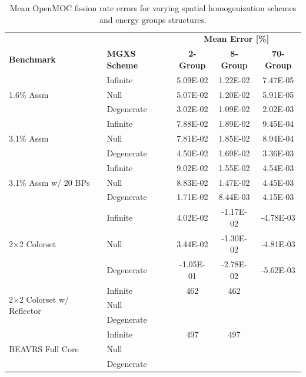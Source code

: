 \begin{table}[h!]
  \centering
  \caption[Mean OpenMOC fission rate errors]{Mean OpenMOC fission rate errors for varying spatial homogenization schemes and energy groups structures.}
  \small
  \label{table:chap8-openmoc-mean-fiss-rates}
  \vspace{6pt}
  \begin{tabular}{l l c c c}
  \toprule
  \rowcolor{lightgray}
  & & \multicolumn{3}{c}{\cellcolor{lightgray} \textbf{Mean Error [\%]}} \\
  \multirow{-2}{*}{\cellcolor{lightgray} \bf Benchmark} &
  \multirow{-2}{*}{\cellcolor{lightgray} \bf \ac{MGXS} Scheme} &
  {\cellcolor{lightgray} \bf 2-Group} &
  {\cellcolor{lightgray} \bf 8-Group} &
  {\cellcolor{lightgray} \bf 70-Group} \\
  \midrule
\multirow{3}{*}{\parbox{2.5cm}{1.6\% Assm}} & Infinite & 5.09E-02 & 1.22E-02 & 7.47E-05 \\
& Null & 5.07E-02 & 1.20E-02 & 5.91E-05 \\
& Degenerate & 3.02E-02 & 1.09E-02 & 2.02E-03 \\
  \midrule
\multirow{3}{*}{\parbox{2.5cm}{3.1\% Assm}} & Infinite & 7.88E-02 & 1.89E-02 & 9.45E-04 \\
& Null & 7.81E-02 & 1.85E-02 & 8.94E-04 \\
& Degenerate & 4.50E-02 & 1.69E-02 & 3.36E-03 \\
  \midrule
\multirow{3}{*}{\parbox{2.5cm}{3.1\% Assm w/ 20 BPs}} & Infinite & 9.02E-02 & 1.55E-02 & 4.54E-03 \\
& Null & 8.83E-02 & 1.47E-02 & 4.45E-03 \\
& Degenerate & 1.71E-02 & 8.44E-03 & 4.15E-03 \\
  \midrule
  \multirow{3}{*}{\parbox{2.5cm}{2$\times$2 Colorset}} & Infinite & 4.02E-02 & -1.17E-02 & -4.78E-03 \\
& Null & 3.44E-02 & -1.30E-02 & -4.81E-03 \\
& Degenerate & -1.05E-01 & -2.78E-02 & -5.62E-03 \\
  \midrule
  \multirow{3}{*}{\parbox{2.3cm}{2$\times$2 Colorset w/ Reflector}} & Infinite & 462 & 462 & \\
  & Null & & & \\
  & Degenerate & & & \\
  \midrule
  \multirow{3}{*}{\parbox{2cm}{\ac{BEAVRS} Full Core}} & Infinite & 497 & 497 & \\
  & Null & & & \\
  & Degenerate & & & \\
  \bottomrule
\end{tabular}
\end{table}

